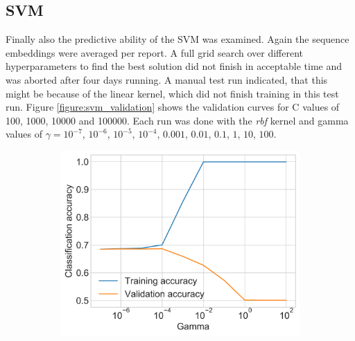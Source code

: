 \subsection{\acl{SVM}}
Finally also the predictive ability of the \ac{SVM} was examined.
Again the sequence embeddings were averaged per report.
A full grid search over different hyperparameters to find the best solution did not finish in acceptable time and was aborted after four days running.
A manual test run indicated, that this might be because of the linear kernel, which did not finish training in this test run.
Figure \ref{figure:svm_validation} shows the validation curves for C values of 100, 1000, 10000 and 100000.
Each run was done with the \textit{rbf} kernel and gamma values of $\gamma=10^{-7}$, $10^{-6}$, $10^{-5}$, $10^{-4}$, $0.001$, $0.01$, $0.1$, $1$, $10$, $100$.
\begin{figure}[h]
    \begin{subfigure}{0.5\textwidth}
        \centering
        \includegraphics[width=\textwidth]{figures/charts/svm_validation_C_100.png}

\end{subfigure}
\end{figure}
